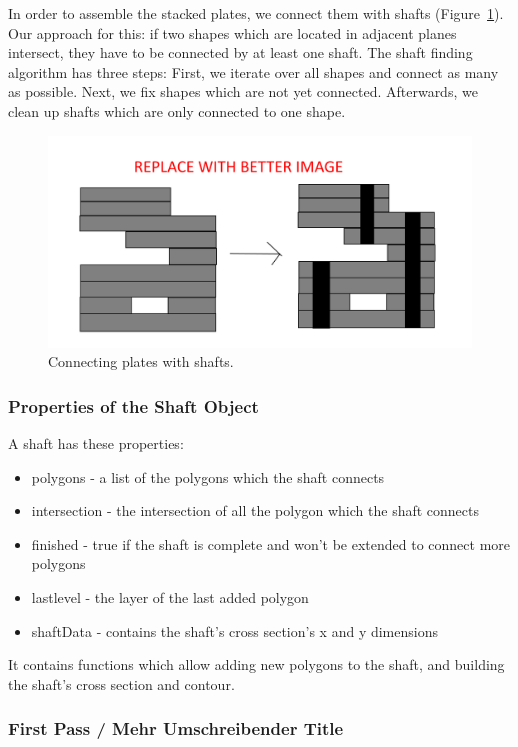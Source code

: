 \documentclass[../ClassicThesis.tex]{subfiles}
\begin{document}
In order to assemble the stacked plates, we connect them with shafts (Figure~\ref{fig:shafts}). Our approach for this: if two shapes which are located in adjacent planes intersect, they have to be connected by at least one shaft. The shaft finding algorithm has three steps: First, we iterate over all shapes and connect as many as possible. Next, we fix shapes which are not yet connected. Afterwards, we clean up shafts which are only connected to one shape.

\begin{figure}
    \centering
    \includegraphics[width=1.0\columnwidth]{Images/plates_shafts.png}
    \caption{Connecting plates with shafts.}
    \label{fig:shafts}
\end{figure}

\subsubsection{Properties of the Shaft Object}

A shaft has these properties:
\begin{itemize}
    \item polygons - a list of the polygons which the shaft connects
    \item intersection - the intersection of all the polygon which the shaft connects
    \item finished - true if the shaft is complete and won't be extended to connect more polygons
    \item lastlevel - the layer of the last added polygon
    \item shaftData - contains the shaft's cross section's x and y dimensions
\end{itemize}
It contains functions which allow adding new polygons to the shaft, and building the shaft's cross section and contour.

\subsubsection{First Pass / Mehr Umschreibender Title}
\end{document}
